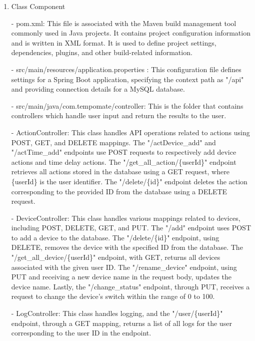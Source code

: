 \begin{enumerate}
\begin{enumerate}
          \end{enumerate}
    \item Class Component \\
    \item[-] pom.xml: This file is associated with the Maven build management tool commonly used in Java projects. It contains project configuration information and is written in XML format. It is used to define project settings, dependencies, plugins, and other build-related information.\\
    \item[-] src/main/resources/application.properties : This configuration file defines settings for a Spring Boot application, specifying the context path as "/api" and providing connection details for a MySQL database.\\
    \item[-] src/main/java/com.tempomate/controller: This is the folder that contains controllers which handle user input and return the results to the user. \\
    \item[-] ActionController: This class handles API operations related to actions using POST, GET, and DELETE mappings. The "/actDevice\_add" and "/actTime\_add" endpoints use POST requests to respectively add device actions and time delay actions. The "/get\_all\_action/\{userId\}" endpoint retrieves all actions stored in the database using a GET request, where \{userId\} is the user identifier. The "/delete/\{id\}" endpoint deletes the action corresponding to the provided ID from the database using a DELETE request.\\
    \item[-] DeviceController: This class handles various mappings related to devices, including POST, DELETE, GET, and PUT. The "/add" endpoint uses POST to add a device to the database. The "/delete/\{id\}" endpoint, using DELETE, removes the device with the specified ID from the database. The "/get\_all\_device/\{userId\}" endpoint, with GET, returns all devices associated with the given user ID. The "/rename\_device" endpoint, using PUT and receiving a new device name in the request body, updates the device name. Lastly, the "/change\_status" endpoint, through PUT, receives a request to change the device's switch within the range of 0 to 100. \\
    \item[-] LogController: This class handles logging, and the "/user/\{userId\}" endpoint, through a GET mapping, returns a list of all logs for the user corresponding to the user ID in the endpoint. \\

\end{enumerate}
